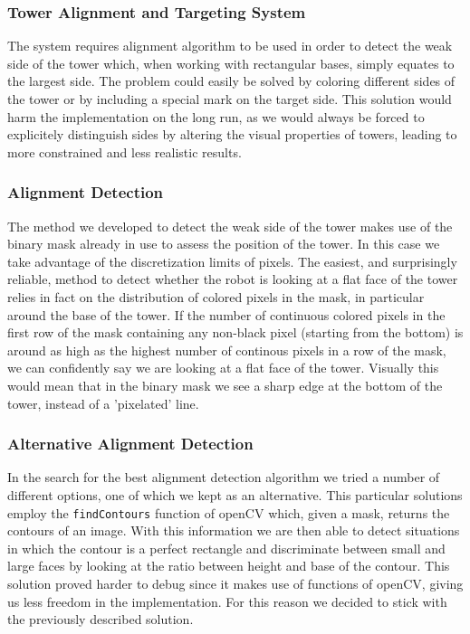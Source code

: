 \subsubsection{Tower Alignment and Targeting System}
The system requires alignment algorithm to be used in order to detect the weak side of the tower which, when working with rectangular bases, simply equates to the largest side. The problem could easily be solved by coloring different sides of the tower or by including a special mark on the target side. This solution would harm the implementation on the long run, as we would always be forced to explicitely distinguish sides by altering the visual properties of towers, leading to more constrained and less realistic results.
\subsubsection{Alignment Detection}
The method we developed to detect the weak side of the tower makes use of the binary mask already in use to assess the position of the tower. In this case we take advantage of the discretization limits of pixels. The easiest, and surprisingly reliable, method to detect whether the robot is looking at a flat face of the tower relies in fact on the distribution of colored pixels in the mask, in particular around the base of the tower. If the number of continuous colored pixels in the first row of the mask containing any non-black pixel (starting from the bottom) is around as high as the highest number of continous pixels in a row of the mask, we can confidently say we are looking at a flat face of the tower. Visually this would mean that in the binary mask we see a sharp edge at the bottom of the tower, instead of a 'pixelated' line.
\subsubsection*{Alternative Alignment Detection}
In the search for the best alignment detection algorithm we tried a number of different options, one of which we kept as an alternative. This particular solutions employ the \texttt{findContours} function of openCV which, given a mask, returns the contours of an image. With this information we are then able to detect situations in which the contour is a perfect rectangle and discriminate between small and large faces by looking at the ratio between height and base of the contour. This solution proved harder to debug since it makes use of functions of openCV, giving us less freedom in the implementation. For this reason we decided to stick with the previously described solution.

